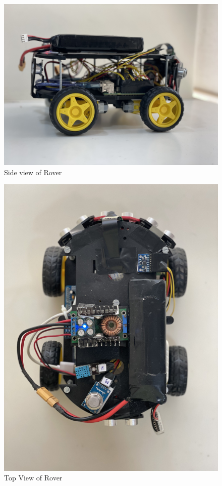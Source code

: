 \documentclass[conference,a4paper]{IEEEtran}
\begin{document}
\begin{figure}[ht]
\centering
\includegraphics[width=1\linewidth]{Roverside.jpg}
\caption{Side view of Rover}
\label{Fig: Rover Side}
\end{figure}

\begin{figure}[ht]
\centering
\includegraphics[width=1\linewidth]{Rovertop.jpg}
\caption{Top View of Rover}
\label{Fig: Rover Top}
\end{figure}
\end{document}
